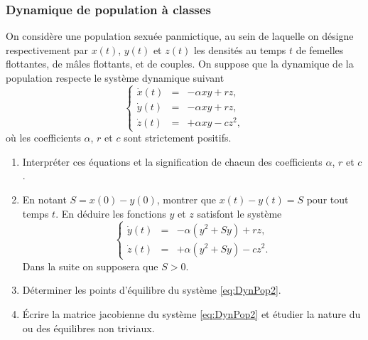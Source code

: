 \subsubsection{Dynamique de population à classes}

  On considère une population sexuée panmictique, au sein de laquelle on désigne
  respectivement par $x(t)$, $y(t)$ et $z(t)$ les densités au temps $t$ de femelles flottantes, de mâles flottants, et de couples. On suppose que la dynamique de la population respecte le système dynamique suivant
  \begin{equation} \label{eq:DynPop}
    \left\{\begin{array}{rcl}
            \dot x(t) & = & - \alpha x y + r z, \\
            \dot y(t) & = & - \alpha x y + r z, \\
            \dot z(t) & = & + \alpha x y - c z^2,
           \end{array} \right.
  \end{equation}
  où les coefficients $\alpha$, $r$ et $c$ sont strictement positifs.
  \begin{enumerate}
   \item Interpréter ces équations et la signification de chacun des coefficients $\alpha$, $r$ et $c$.
   \item En notant $S = x(0) - y(0)$, montrer que $x(t) - y(t) = S$ pour tout temps $t$. En déduire les fonctions $y$ et $z$ satisfont le système 
  \begin{equation} \label{eq:DynPop2}
    \left\{\begin{array}{rcl}
            \dot y(t) & = & - \alpha (y^2 + Sy) + r z, \\
            \dot z(t) & = & + \alpha (y^2 + Sy) - c z^2.
           \end{array} \right.
  \end{equation}
  Dans la suite on supposera que $S > 0$.
  \item Déterminer les points d'équilibre du système \eqref{eq:DynPop2}.
  \item \'Ecrire la matrice jacobienne du système \eqref{eq:DynPop2} et étudier la nature du ou des équilibres non triviaux.
  \end{enumerate}

